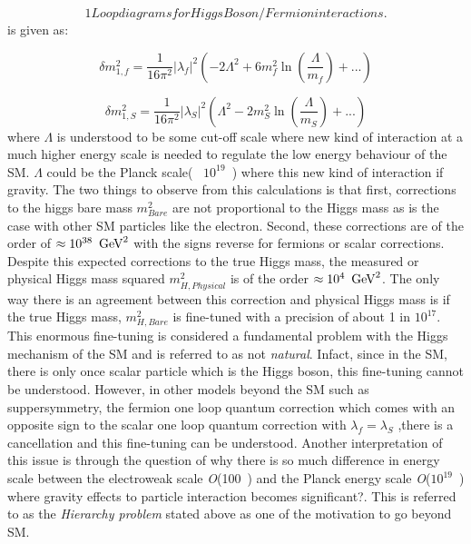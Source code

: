 \begin{equation}
 1 Loop diagrams for Higgs Boson/Fermion interactions.
\end{equation}
is given as:

\begin{equation}
\delta m^{2}_{1,f} = \frac{1}{16\pi^{2}}|\lambda_{f}|^{2}\left(-2\Lambda^{2} + 6m^{2}_{f}\ln\left(\frac{\Lambda}{m_{f}}\right) + ...\right) 
\end{equation}

\begin{equation}
\delta m^{2}_{1,S} = \frac{1}{16\pi^{2}}|\lambda_{S}|^{2}\left(\Lambda^{2} - 2m^{2}_{S}\ln\left(\frac{\Lambda}{m_{S}}\right) + ...\right) 
\end{equation}
where $\Lambda$ is understood to be some cut-off scale where new kind of interaction at a much higher energy scale is needed to regulate the low energy behaviour of the SM. $\Lambda$ could be the Planck scale(~ $10^{19}$~\GeV) where this new kind of interaction if gravity. The two things to observe from this calculations is that first, corrections to the higgs bare mass $m^{2}_{Bare}$ are not proportional to the Higgs mass as is the case with other SM particles like the electron\cite{}.
Second, these corrections are of the order of $\approx 10^{38}~\,\text{Ge\hspace{-.08em}V}^{2}$  with the signs reverse for fermions or scalar corrections.
Despite this expected  corrections to the true Higgs mass, the measured or physical Higgs mass squared $m^{2}_{H,Physical}$ is of the order $\approx 10^{4}~\,\text{Ge\hspace{-.08em}V}^{2}$.
The only way there is an agreement between this correction and physical Higgs mass is if the true Higgs mass, $m^{2}_{H,Bare}$ is fine-tuned with a precision of about 1 in $10^{17}$. This enormous fine-tuning is considered a fundamental problem with the Higgs mechanism of the SM and is referred to as not \textit{natural}. Infact, since in the SM, there is only once scalar particle which is the Higgs boson, this fine-tuning cannot be understood. However, in other models beyond the SM such as suppersymmetry, the fermion one loop quantum correction which comes with an opposite sign to the scalar one loop quantum correction with $\lambda_{f} = \lambda_{S}$ ,there is a cancellation and this fine-tuning can be understood. Another interpretation of this issue is through the question of why there is so much difference in energy scale between the electroweak scale \textit{O}(100~\GeV) and the Planck energy scale \textit{O}($10^{19}$~\GeV) where gravity effects to particle interaction becomes significant?. This is referred to as the \textit{Hierarchy problem} stated above as one of the motivation to go beyond SM.
